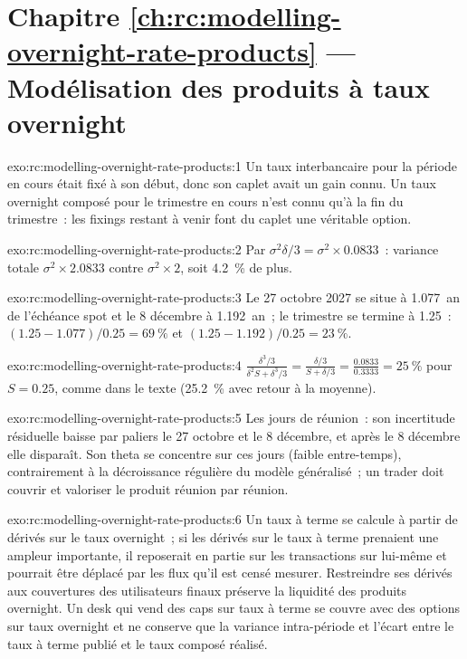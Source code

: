 \section*{Chapitre \ref{ch:rc:modelling-overnight-rate-products} --- Modélisation des produits à taux overnight}

\begin{solution}{exo:rc:modelling-overnight-rate-products:1}
Un taux interbancaire pour la période en cours était fixé à son début, donc son caplet avait
un gain connu. Un taux overnight composé pour le trimestre en cours n'est connu qu'à
la fin du trimestre~: les fixings restant à venir font du caplet une véritable option.
\end{solution}

\begin{solution}{exo:rc:modelling-overnight-rate-products:2}
Par $\sigma^2\delta/3 = \sigma^2\times0.0833$~: variance totale $\sigma^2\times2.0833$ contre
$\sigma^2\times2$, soit 4.2~\% de plus.
\end{solution}

\begin{solution}{exo:rc:modelling-overnight-rate-products:3}
Le 27 octobre 2027 se situe à 1.077~an de l'échéance spot et le 8 décembre à 1.192~an~; le trimestre se termine à
1.25~: $(1.25-1.077)/0.25 = 69~\%$ et $(1.25-1.192)/0.25 = 23~\%$.
\end{solution}

\begin{solution}{exo:rc:modelling-overnight-rate-products:4}
$\frac{\delta^3/3}{\delta^2S+\delta^3/3} = \frac{\delta/3}{S+\delta/3} = \frac{0.0833}{0.3333} = 25~\%$ pour
$S=0.25$, comme dans le texte (25.2~\% avec retour à la moyenne).
\end{solution}

\begin{solution}{exo:rc:modelling-overnight-rate-products:5}
Les jours de réunion~: son incertitude résiduelle baisse par paliers le 27 octobre et le
8 décembre, et après le 8 décembre elle disparaît. Son theta se concentre sur ces jours
(faible entre-temps), contrairement à la décroissance régulière du modèle généralisé~; un trader doit
couvrir et valoriser le produit réunion par réunion.
\end{solution}

\begin{solution}{exo:rc:modelling-overnight-rate-products:6}
Un taux à terme se calcule à partir de dérivés sur le taux overnight~; si les dérivés sur
le taux à terme prenaient une ampleur importante, il reposerait en partie sur les transactions sur lui-même et pourrait être déplacé
par les flux qu'il est censé mesurer. Restreindre ses dérivés aux
couvertures des utilisateurs finaux préserve la liquidité des produits overnight. Un desk qui vend des caps sur taux à terme
se couvre avec des options sur taux overnight et ne conserve que la variance intra-période et
l'écart entre le taux à terme publié et le taux composé réalisé.
\end{solution}

